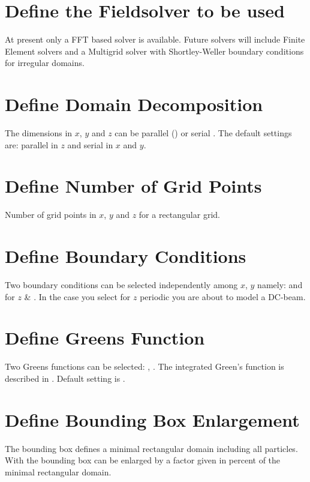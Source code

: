 \section{Define the Fieldsolver to be used}
\label{sec:FSFSTYPE}
At present only a FFT based solver is available. Future solvers will include
Finite Element solvers and a Multigrid solver with Shortley-Weller boundary conditions for
irregular domains.

\section{Define Domain Decomposition}
\label{sec:FSDomDEC}
The dimensions in  $x$, $y$ and $z$ can be parallel ()  or serial . The
default settings are: parallel in $z$ and serial in $x$ and $y$.

\section{Define Number of Grid Points}
\label{sec:FSMX}
Number of grid points in $x$, $y$ and $z$ for a rectangular grid.

\section{Define Boundary Conditions}
\label{sec:FSBC}
Two boundary conditions can be selected independently among $x$, $y$ namely:   and for $z$  \& .
In the case you select for $z$ periodic you are about to model a DC-beam.

\section{Define Greens Function}
\label{sec:FSGREEN}
Two Greens functions can be selected: , . The integrated Green's function is described in \cite{qiang2005, qiang2006-1, qiang2006-2}. Default setting is .

\section{Define Bounding Box Enlargement}
\label{sec:FSBBOX}
The bounding box defines a minimal rectangular domain including all particles. With 
the bounding box can be enlarged by a factor given in percent of the minimal rectangular domain.

